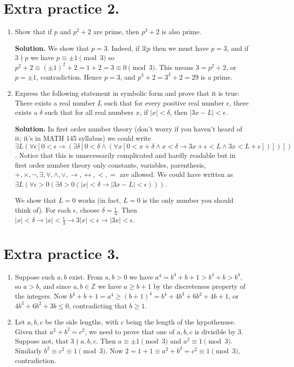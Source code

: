 \documentclass[11pt]{article}
\begin{document}
\section {Extra practice 2.}
\begin{enumerate}
\item Show that if $p$ and $p^2+2$ are prime, then $p^3+2$ is also prime.

\textbf {Solution.} We show that $p=3$. Indeed, if $3|p$ then we must have $p=3$, and if $3\nmid p$ we have $p\equiv \pm 1\pmod{3}$ so $p^2+2\equiv (\pm 1)^2+2=1+2=3\equiv 0\pmod {3}$. This means $3=p^2+2$, or $p=\pm 1$, contradiction. Hence $p=3$, and $p^3+2=3^3+2=29$ is a prime.

\item Express the following statement in symbolic form and prove that it is true:\\
There exists a real number $L$ such that for every positive real number $\epsilon$, there exists a $\delta$ such that for all real numbers $x$, if $|x|<\delta$, then $|3x-L|<\epsilon$.

\textbf {Solution.} In first order number theory (don't worry if you haven't heard of it; it's in MATH 145 syllabus) we could write $\exists L(\forall\epsilon [0<\epsilon \to(\exists\delta [0<\delta\land (\forall x [0<x+\delta \land x<\delta\to 3x+\epsilon<L\land 3x<L+\epsilon ])])])$. Notice that this is unnecessarily complicated and hardly readable but in first order number theory only constants, variables, parenthesis, $+, \times, \neg, \exists, \forall, \land, \lor, \to, \leftrightarrow, <, =$ are allowed. We could have written as $\exists L(\forall \epsilon>0(\exists\delta>0 (|x|<\delta \to |3x-L|<\epsilon)))$.

We show that $L=0$ works (in fact, $L=0$ is the only number you should think of). For each $\epsilon$, choose $\delta=\frac{\epsilon}{3}$. Then $|x|<\delta\to |x|<\frac{\epsilon}{3}\to 3|x|<\epsilon \to |3x|<\epsilon$.

\end{enumerate}

\section {Extra practice 3.}
\begin{enumerate}
\item Suppose such $a,b$ exist. From $a,b>0$ we have $a^4=b^4+b+1>b^4+b>b^4$, so $a>b$, and since $a,b\in\mathbb{Z}$ we have $a\ge b+1$ by the discreteness property of the integers. Now $b^4+b+1=a^4\ge (b+1)^4=b^4+4b^3+6b^2+4b+1$, or $4b^3+6b^2+3b\le 0$, contradicting that $b\ge 1$.

\item Let $a,b,c$ be the side lengths, with $c$ being the length of the hypothenuse. Given that $a^2+b^2=c^2$, we need to prove that one of $a,b,c$ is divisible by 3. Suppose not, that $3\nmid a, b, c$. Then $a\equiv \pm 1\pmod {3}$ and $a^2\equiv 1\pmod {3}$. Similarly $b^2\equiv c^2\equiv 1\pmod {3}$. Now $2=1+1\equiv a^2+b^2=c^2\equiv 1\pmod {3},$ contradiction.
\end{enumerate}
\end{document}
